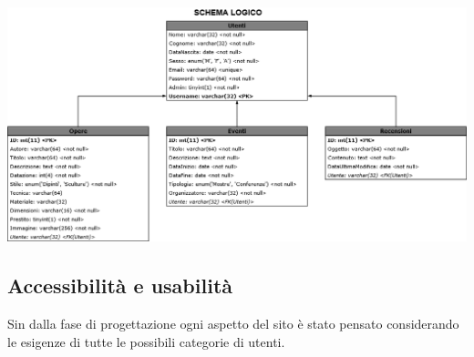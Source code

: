\begin{center}
	\includegraphics[width=\textwidth]{img/SchemaLogico}
\end{center}


\subsection{Accessibilità e usabilità}
\label{progettazione-accessibilità-usabilità}
Sin dalla fase di progettazione ogni aspetto del sito è stato pensato considerando le esigenze di tutte le possibili categorie di utenti. 


